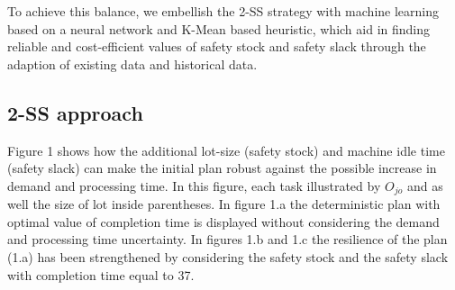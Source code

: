 \documentclass[letterpaper]{article} %
\begin{document}
To achieve this balance, we embellish the 2-SS strategy with machine
learning based on a neural network and \mbox{K-Mean} based heuristic,  which
aid in finding reliable and cost-efficient values of safety stock and safety slack through the adaption of
existing data and historical data. 



\subsection{2-SS approach}
Figure 1 shows how the additional lot-size (safety stock) and machine idle time (safety slack) can make the initial plan robust against the possible increase in demand and processing time. In this figure, each task illustrated by $O_{jo}$ and as well the size of lot inside parentheses. In figure 1.a the deterministic plan with optimal value of completion time  is displayed without considering the demand and processing time uncertainty. In figures 1.b and 1.c the resilience of the plan (1.a) has been strengthened by considering the safety stock and the safety slack with completion time equal to 37.
\end{document}
